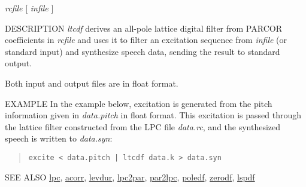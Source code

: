 \begin{synopsis}
\item [ltcdf] [ --m $M$ ] [ --p $P$ ] [ --i $I$ ] [ --k ] {\em rcfile} 
	      [ {\em infile} ] 
\end{synopsis}

\begin{qsection}{DESCRIPTION}
{\em ltcdf} derives an all-pole lattice digital filter 
from PARCOR coefficients in {\em rcfile} 
and uses it to filter an excitation sequence
from {\em infile} (or standard input) and synthesize speech data, 
sending the result to standard output.

Both input and output files are in float format.
\end{qsection}

\begin{options}
\end{options}

\begin{qsection}{EXAMPLE}
In the example below, excitation is generated from the
pitch information given in {\em data.pitch} in float format.
This excitation is passed through the lattice filter
constructed from the LPC file {\em data.rc},
and the synthesized speech is written to {\em data.syn}:
\begin{quote}
 \verb!excite < data.pitch | ltcdf data.k > data.syn!
\end{quote} 
\end{qsection}

\begin{qsection}{SEE ALSO}
\hyperlink{lpc}{lpc},
\hyperlink{acorr}{acorr},
\hyperlink{levdur}{levdur},
\hyperlink{lpc2par}{lpc2par},
\hyperlink{par2lpc}{par2lpc},
\hyperlink{poledf}{poledf},
\hyperlink{zerodf}{zerodf},
\hyperlink{lspdf}{lspdf}
\end{qsection}
